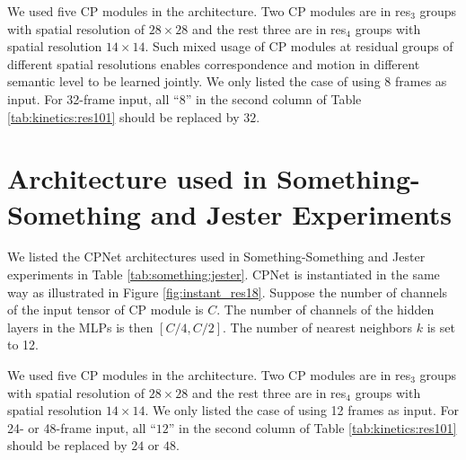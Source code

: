 \documentclass[10pt,twocolumn,letterpaper]{article}
\begin{document}
We used five CP modules in the architecture. Two CP modules are in res$_3$ groups with spatial resolution of $28\times 28$ and the rest three are in res$_4$ groups with spatial resolution $14\times 14$. Such mixed usage of CP modules at residual groups of different spatial resolutions enables correspondence and motion in different semantic level to be learned jointly. We only listed the case of using 8 frames as input. For 32-frame input, all ``$8$'' in the second column of Table \ref{tab:kinetics:res101} should be replaced by $32$.





\section{Architecture used in Something-Something and Jester Experiments}
\label{sec:something:jester}

We listed the CPNet architectures used in Something-Something \cite{Something:Something} and Jester \cite{Jester} experiments in Table \ref{tab:something:jester}. CPNet is instantiated in the same way as illustrated in Figure \ref{fig:instant_res18}. 
Suppose the number of channels of the input tensor of CP module is $C$. The number of channels of the hidden layers in the MLPs is then $[C/4, C/2]$. The number of nearest neighbors $k$ is set to 12.

We used five CP modules in the architecture. Two CP modules are in res$_3$ groups with spatial resolution of $28\times 28$ and the rest three are in res$_4$ groups with spatial resolution $14\times 14$. We only listed the case of using 12 frames as input. For 24- or 48-frame input, all ``$12$'' in the second column of Table \ref{tab:kinetics:res101} should be replaced by $24$ or $48$.
\end{document}
